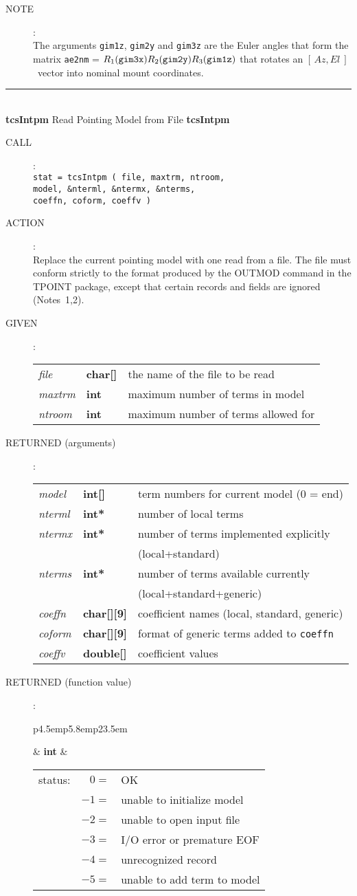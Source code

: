 \documentclass[12pt,fleqn,twoside]{article}
\renewcommand{\_}{{\tt\char'137}}     %
\newcommand{\azel}      {$[\,Az,El~]$}
\newcommand{\routine}[2]
{
  \newpage
  \rule{\textwidth}{0.3mm}\\ \nopagebreak
  {\Large {\bf #1} \hfill #2 \hfill {\bf #1}}
  \vspace{-1ex}
}
\newcommand{\call}[1]
{
  \goodbreak
  \begin{description}
    \item[CALL]: \\[0.5ex] \nopagebreak
        {\tt #1}
  \end{description}
  \vspace{-3ex}
}
\newcommand{\action}[1]
{
  \goodbreak
  \begin{description}
    \item[ACTION]: \\[0.5ex] \nopagebreak
        #1
  \end{description}
  \vspace{-3ex}
}
\newcommand{\args}[2]
{
  \goodbreak
  \begin{description}
  \item[#1]: \\[1.5ex] \nopagebreak
    \hspace*{-0.9em}
    \begin{tabular}{p{4.5em}p{5.8em}p{23.5em}}
      #2
    \end{tabular}
  \end{description}
  \vspace{-3ex}
}
\newcommand{\spec}[3]
{
  {\em {#1}} & {\bf \mbox{#2}} & {#3}
}
\newcommand{\anote}[1]
{
  \goodbreak
  \begin{description}
    \item[NOTE]: \\[0.5ex] \nopagebreak
        #1
  \end{description}
  \vspace{-3ex}
}
\begin{document}
\anote{The arguments {\tt gim1z}, {\tt gim2y} and {\tt gim3z} are the
       Euler angles that form the matrix {\tt ae2nm} =
       $R_1({\tt gim3x})R_2({\tt gim2y})R_3({\tt gim1z})$
       that rotates an \azel\ vector
       into nominal mount coordinates.}
\routine{tcsIntpm}{Read Pointing Model from File}
\label{tcsIntpm}
\call{stat = tcsIntpm ( file, maxtrm, ntroom, \\
        \hspace*{8.6em} model, \&nterml, \&ntermx, \&nterms, \\
        \hspace*{8.6em} coeffn, coform, coeffv ) }
\action{Replace the current pointing model with one read from a file.
        The file must conform strictly to the format produced by the
        OUTMOD command in the TPOINT package, except that certain
        records and fields are ignored (Notes~1,2).}
\args{GIVEN}
{
\spec{file}{char[]}{the name of the file to be read} \\
\spec{maxtrm}{int}{maximum number of terms in model} \\
\spec{ntroom}{int}{maximum number of terms allowed for}
}
\args{RETURNED \rm (arguments)}
{
\spec{model}{int[]}{term numbers for current model (0 = end)} \\
\spec{nterml}{int*}{number of local terms} \\
\spec{ntermx}{int*}{number of terms implemented explicitly} \\
\spec{}{}{\hfill (local+standard)} \\
\spec{nterms}{int*}{number of terms available currently} \\
\spec{}{}{\hfill (local+standard+generic)} \\
\spec{coeffn}{char[][9]}{coefficient names (local, standard, generic)} \\
\spec{coform}{char[][9]}{format of generic terms added to {\tt coeffn}} \\
\spec{coeffv}{double[]}{coefficient values}
}
\args{RETURNED \rm (function value)}
{
\spec{}{int}{\hspace{-1.8ex}
             \begin{tabular}[t]{lrl}
                 status: & $  0 = $ & OK \\
                         & $ -1 = $ & unable to initialize model \\
                         & $ -2 = $ & unable to open input file \\
                         & $ -3 = $ & I/O error or premature EOF \\
                         & $ -4 = $ & unrecognized record \\
                         & $ -5 = $ & unable to add term to model \\
             \end{tabular}
            }
}
\end{document}
